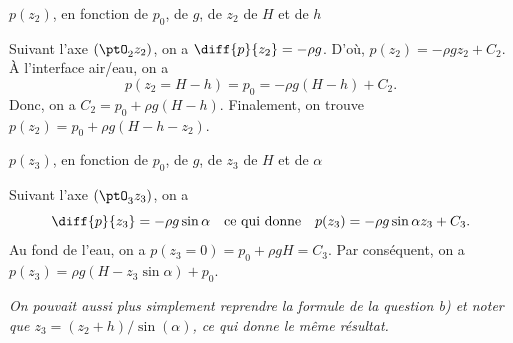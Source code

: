 


\begin{enonce}
$p(z_{2})$, en fonction de $p_0$, de $g$, de $z_2$ de $H$ et de $h$
\end{enonce}


\begin{corrigeNewpage}
Suivant l'axe $\left(\ptO_{2}z_{2}\right)$, on a $\diff{p}{z_{2}}=-\rho g$. D'où, $p(z_{2})=-\rho gz_{2}+C_{2}$.
À l'interface air/eau, on a 
\[
p(z_{2}=H-h)=p_{0}=-\rho g\left(H-h\right)+C_{2}.
\]
 Donc, on a $C_{2}=p_{0}+\rho g\left(H-h\right)$. Finalement, on trouve
$p\left(z_{2}\right)=p_{0}+\rho g\left(H-h-z_{2}\right)$.
\end{corrigeNewpage}



\begin{enonce}
$p(z_{3})$, en fonction de $p_0$, de $g$, de $z_3$ de $H$ et de $\alpha$
\end{enonce}


\begin{corrige}
Suivant l'axe $\left(\ptO_{3}z_{3}\right)$, on a
\[
\diff{p}{z_{3}}=-\rho g\sin\alpha
\quad\text{ce qui donne}\quad
p(z_{3})=-\rho g\sin\alpha z_{3}+C_{3}.
\]
Au fond de l'eau, on a $p(z_{3}=0)=p_{0}+\rho gH=C_{3}$. Par conséquent, on a $p(z_{3})=\rho g\left(H-z_{3}\sin\alpha\right)+p_{0}$.

{\itshape On pouvait aussi plus simplement reprendre la formule de la question b) et noter que $z_3=(z_2+h)/\sin(\alpha)$, ce qui donne le même résultat.} 
\end{corrige}



\finEntrainement



